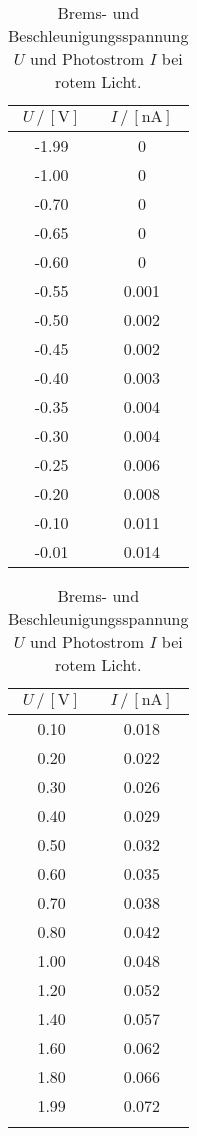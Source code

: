 \begin{table}
  \centering
  \caption{Brems- und Beschleunigungsspannung $U$ und Photostrom $I$ bei rotem Licht.}
  \begin{tabular}{|c|c|}
    \toprule
    $U \,/\, [\si{\volt}]$ & $I \,/\, [\si{\nano\ampere}]$\\
    \midrule
    -1.99 & 0\\
    -1.00 & 0\\
    -0.70 & 0\\
    -0.65 & 0\\
    -0.60 & 0\\
    -0.55 & 0.001\\
    -0.50 & 0.002\\
    -0.45 & 0.002\\
    -0.40 & 0.003\\
    -0.35 & 0.004\\
    -0.30 & 0.004\\
    -0.25 & 0.006\\
    -0.20 & 0.008\\
    -0.10 & 0.011\\
    -0.01 & 0.014\\
    \bottomrule
  \end{tabular}
  \begin{tabular}{|c|c|}
    \toprule
    $U \,/\, [\si{\volt}]$ & $I \,/\, [\si{\nano\ampere}]$\\
    \midrule
    0.10 & 0.018\\
    0.20 & 0.022\\
    0.30 & 0.026\\
    0.40 & 0.029\\
    0.50 & 0.032\\
    0.60 & 0.035\\
    0.70 & 0.038\\
    0.80 & 0.042\\
    1.00 & 0.048\\
    1.20 & 0.052\\
    1.40 & 0.057\\
    1.60 & 0.062\\
    1.80 & 0.066\\
    1.99 & 0.072\\
    \text{---} & \text{---}\\
    \bottomrule
  \end{tabular}
  \label{tab:rot}
\end{table}